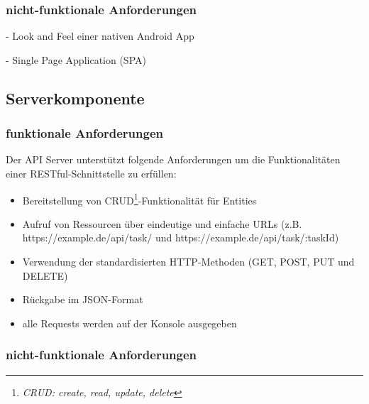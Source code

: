 \subsubsection{nicht-funktionale Anforderungen}

- Look and Feel einer nativen Android App

- Single Page Application (SPA)

\newpage
\subsection{Serverkomponente}

\subsubsection{funktionale Anforderungen}

Der API Server unterstützt folgende Anforderungen um die Funktionalitäten einer RESTful-Schnittstelle zu erfüllen:

\begin{itemize}  
\item Bereitstellung von CRUD\footnote{\textit{CRUD: create, read, update, delete}}-Funktionalität für Entities
\item Aufruf von Ressourcen über eindeutige und einfache URLs (z.B. https://example.de/api/task/ und https://example.de/api/task/:taskId) 
\item Verwendung der standardisierten HTTP-Methoden (GET, POST, PUT und DELETE) 
\item Rückgabe im JSON-Format
\item alle Requests werden auf der Konsole ausgegeben
\end{itemize}


\subsubsection{nicht-funktionale Anforderungen}
